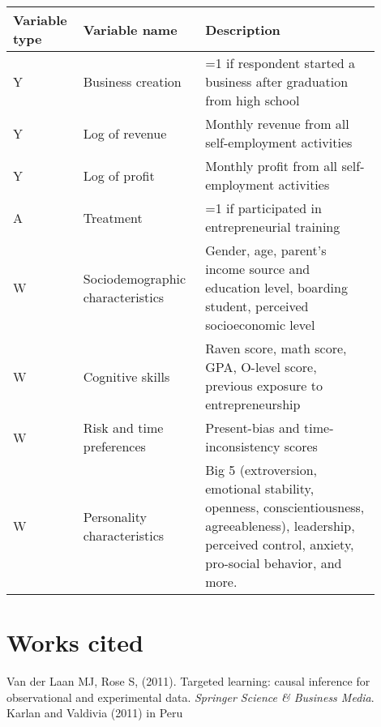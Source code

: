 \documentclass[oneside, notitlepage]{book}
\begin{document}
\begin{center}
\begin{tabular}{ | p{0.15\linewidth} | p{0.3\linewidth} |  p{0.45\linewidth} | } 
 \hline
 Variable type & Variable name & Description \\ 

\hline
 Y & Business creation & =1 if respondent started a business after graduation from high school \\ 

\hline
 Y &Log of revenue & Monthly revenue from all self-employment activities \\ 

\hline 
Y & Log of profit & Monthly profit from all self-employment activities \\

\hline
A & Treatment & =1 if participated in entrepreneurial training \\

\hline
W & Sociodemographic characteristics & Gender, age, parent’s income source and education level, boarding student, perceived socioeconomic level \\

\hline
W & Cognitive skills & Raven score, math score, GPA, O-level score, previous exposure to entrepreneurship  \\

\hline
W & Risk and time preferences & Present-bias and time-inconsistency scores \\

\hline
W & Personality characteristics & Big 5 (extroversion, emotional stability, openness, conscientiousness, agreeableness), leadership, perceived control, anxiety, pro-social behavior, and more. \\

 \hline
\end{tabular}
\end{center}


\section{Works cited}
\label{sec:works-cited}



Van der Laan MJ, Rose S, (2011). Targeted learning: causal inference for observational and experimental data.\emph{ Springer Science \& Business Media}.\\

Karlan and Valdivia (2011) in Peru\\
\end{document}
